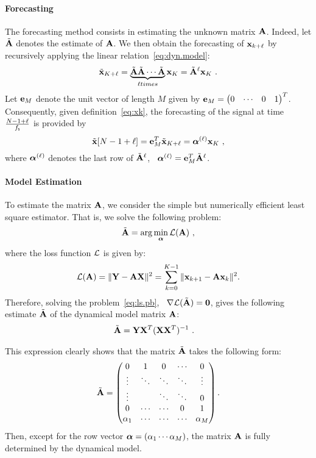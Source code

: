 \paragraph{Forecasting}
The forecasting method consists in estimating the unknown matrix ${\mathbf A}$. Indeed, let $\tilde{{\mathbf A}}$ denotes the estimate of ${\mathbf A}$. 
%
{\color{red}
We then obtain the forecasting of ${\mathbf x}_{k+\ell}$ by recursively applying the linear relation~\eqref{eq:dyn.model}:
\begin{equation*}
\tilde\bx_{K+\ell} = \underbrace{\tilde\bA\tilde\bA\cdots\tilde\bA}_{\scriptstyle\ell\mbox{ \footnotesize {times}}}\bx_{K} = \tilde\bA^\ell\bx_{K}\ .
\end{equation*}  
Let ${\mathbf e}_M$ denote the unit vector of length $M$ given by ${\mathbf e}_M = \begin{pmatrix} 0 & \cdots & 0 & 1\end{pmatrix}^T$. Consequently, given definition~\eqref{eq:xk}, the forecasting of the signal at time $\frac{N-1+\ell}{f_{\mathsf s}}$ is provided by
\begin{equation}
\label{eq:prediction}
\tilde \bx [N-1+\ell] = \be_M^T\tilde\bx_{K+\ell} = \balpha^{(\ell)}\bx_{K}\ ,
\end{equation}  
where $\boldsymbol{\alpha}^{(\ell)}$ denotes the last row of $\tilde{{\mathbf A}}^\ell$, \ie~$\boldsymbol{\alpha}^{(\ell)}={\mathbf e}_M^T\tilde{{\mathbf A}}^\ell$.
}

\paragraph{Model Estimation} To estimate the matrix ${\mathbf A}$, we consider the simple but numerically efficient least square estimator. That is, we solve the following problem:
\begin{equation}
\label{eq:ls.pb}
\tilde\bA = \arg\min_{\balpha} \cL(\bA)\ ,
\end{equation}
where the loss function ${\mathcal L}$ is given by:
\[
{\mathcal L}({\mathbf A}) = \|{\mathbf Y}-{\mathbf A}{\mathbf X}\|^2 = \sum_{k=0}^{K-1} \|{\mathbf x}_{k+1}-{\mathbf A}{\mathbf x}_k\|^2.
\]
Therefore, solving the problem~\eqref{eq:ls.pb}, \ie~$\nabla {\mathcal L}(\tilde{{\mathbf A}})=\boldsymbol{0}$, gives the following estimate $\tilde{{\mathbf A}}$ of the dynamical model matrix ${\mathbf A}$:
\begin{align}
\tilde\bA &= \bY\bX^T(\bX\bX^T)^{-1}\ .
\label{eq:lse}
\end{align}

\begin{remark}
This expression clearly shows that the matrix $\tilde{{\mathbf A}}$ takes the following form:
\[
\tilde{{\mathbf A}} =
\begin{pmatrix}
0       & 1       & 0      & \cdots & 0      \\
\vdots  & \ddots  & \ddots & \ddots & \vdots  \\
\vdots  &         & \ddots & \ddots & 0  \\
0       & \cdots  & \cdots & 0      & 1  \\
\alpha_1& \cdots  & \cdots & \cdots & \alpha_M  \\
\end{pmatrix}.
\]
Then, except for the row vector $\boldsymbol{\alpha} = \left(\alpha_1 \cdots\alpha_M\right)$, the matrix ${\mathbf A}$ is fully determined by the dynamical model.
\end{remark}

